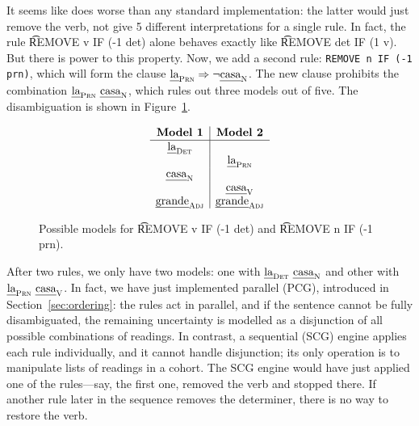 It seems like \satcg{} does worse than any standard \onlycg{} implementation:
the latter would just remove the verb, not give 5 different interpretations for a single rule.
In fact, the rule \t{REMOVE v IF (-1 det)} alone behaves exactly like \t{REMOVE det IF (1 v)}.
But there is power to this property. Now, we add a second rule: \texttt{REMOVE n IF (-1 prn)}, which will form the clause $\text{\em la}_{\text{\sc Prn}} \Rightarrow \neg \text{\em casa}_{\text{\sc N}}$. The new clause
prohibits the combination $\text{\em la}_{\text{\sc Prn}} \ \text{\em casa}_{\text{\sc N}}$, which rules out three models out of five. The disambiguation is shown in Figure~\ref{fig:modelsTwoRules}.

\begin{figure}[h!]
\centering
$$\begin{array}{ c | c }
 \textbf{Model 1}  & \textbf{Model 2}  \\ \hline
 \laDet   &          \\
          &  \laPrn  \\
 \casaN   &          \\
          &  \casaV   \\
\grandeAdj & \grandeAdj \\

\end{array}$$
\caption{Possible models for \t{REMOVE v IF (-1 det)} and \t{REMOVE n IF (-1 prn)}.}
\label{fig:modelsTwoRules}
\end{figure}


After two rules, we only have two models: one with $\text{\em la}_{\text{\sc Det}} \ \text{\em casa}_{\text{\sc N}}$ and other with $\text{\em la}_{\text{\sc Prn}} \ \text{\em casa}_{\text{\sc V}}$. 
In fact, we have just implemented parallel \onlycg{} (PCG), introduced in Section~\ref{sec:ordering}: the rules act in parallel, and if the sentence cannot be fully disambiguated, the remaining uncertainty is modelled as a disjunction of all possible combinations of readings.
In contrast, a sequential \onlycg{} (SCG) engine applies each rule individually, and it cannot handle disjunction; its only operation is to manipulate lists of readings in a cohort.
The SCG engine would have just applied one of the rules---say, the first one, removed the verb and stopped there. If another rule later in the sequence removes the determiner, there is no way to restore the verb. 


